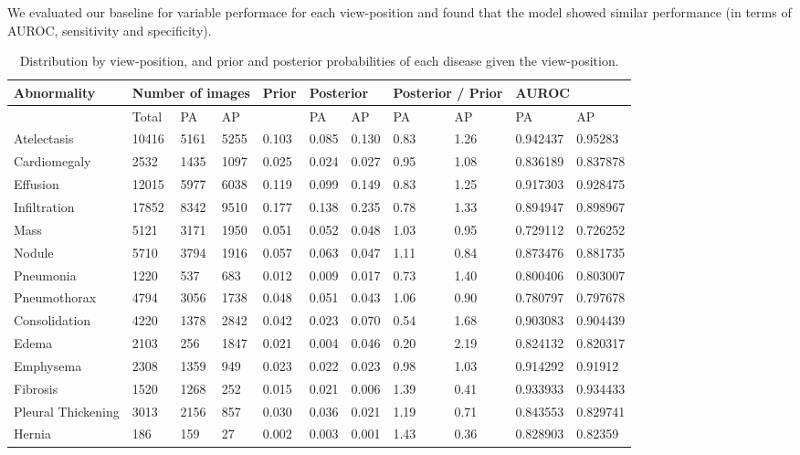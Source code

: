 \documentclass[12pt,oneside,a4paper]{report}
\begin{document}
We evaluated our baseline for variable performace for each view-position and found that the model showed similar performance (in terms of AUROC, sensitivity and specificity).

\begin{landscape}
\begin{table}
\centering
\begin{tabular}{@{}lllllllllll@{}}
\toprule
\textbf{Abnormality}        & \multicolumn{3}{l}{\textbf{Number of images}} &  \textbf{Prior} & \multicolumn{2}{l}{\textbf{Posterior}} & \multicolumn{2}{l}{\textbf{Posterior / Prior}} & \multicolumn{2}{l}{\textbf{AUROC}}       \\ \midrule
                   & Total & PA   & AP   &       & PA    & AP    & PA   & AP   & PA       & AP       \\ \midrule
Atelectasis        & 10416 & 5161 & 5255 & 0.103 & 0.085 & 0.130 & 0.83 & 1.26 & 0.942437 & 0.95283  \\ \midrule
Cardiomegaly       & 2532  & 1435 & 1097 & 0.025 & 0.024 & 0.027 & 0.95 & 1.08 & 0.836189 & 0.837878 \\ \midrule
Effusion           & 12015 & 5977 & 6038 & 0.119 & 0.099 & 0.149 & 0.83 & 1.25 & 0.917303 & 0.928475 \\ \midrule
Infiltration       & 17852 & 8342 & 9510 & 0.177 & 0.138 & 0.235 & 0.78 & 1.33 & 0.894947 & 0.898967 \\ \midrule
Mass               & 5121  & 3171 & 1950 & 0.051 & 0.052 & 0.048 & 1.03 & 0.95 & 0.729112 & 0.726252 \\ \midrule
Nodule             & 5710  & 3794 & 1916 & 0.057 & 0.063 & 0.047 & 1.11 & 0.84 & 0.873476 & 0.881735 \\ \midrule
Pneumonia          & 1220  & 537  & 683  & 0.012 & 0.009 & 0.017 & 0.73 & 1.40 & 0.800406 & 0.803007 \\ \midrule
Pneumothorax       & 4794  & 3056 & 1738 & 0.048 & 0.051 & 0.043 & 1.06 & 0.90 & 0.780797 & 0.797678 \\ \midrule
Consolidation      & 4220  & 1378 & 2842 & 0.042 & 0.023 & 0.070 & 0.54 & 1.68 & 0.903083 & 0.904439 \\ \midrule
Edema              & 2103  & 256  & 1847 & 0.021 & 0.004 & 0.046 & 0.20 & 2.19 & 0.824132 & 0.820317 \\ \midrule
Emphysema          & 2308  & 1359 & 949  & 0.023 & 0.022 & 0.023 & 0.98 & 1.03 & 0.914292 & 0.91912  \\ \midrule
Fibrosis           & 1520  & 1268 & 252  & 0.015 & 0.021 & 0.006 & 1.39 & 0.41 & 0.933933 & 0.934433 \\ \midrule
Pleural Thickening & 3013  & 2156 & 857  & 0.030 & 0.036 & 0.021 & 1.19 & 0.71 & 0.843553 & 0.829741 \\ \midrule
Hernia             & 186   & 159  & 27   & 0.002 & 0.003 & 0.001 & 1.43 & 0.36 & 0.828903 & 0.82359  \\
\bottomrule
\end{tabular}
\caption{Distribution by view-position, and prior and posterior probabilities of each disease given the view-position.}
\label{}
\end{table}
\end{landscape}
\end{document}
